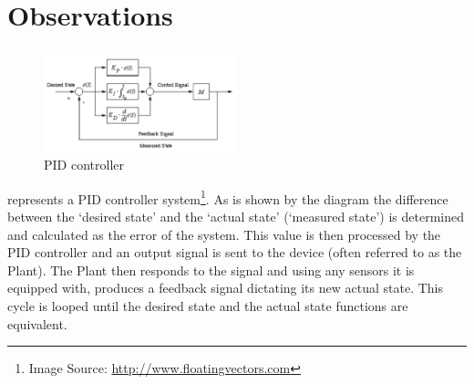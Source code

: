 \section{Observations}\label{section_two}
\begin{figure}[tbd]
\centering
\includegraphics[width=0.5\textwidth]{images/pid.pdf}
\caption{\label{pid-controller} PID controller}
\end{figure}

 represents a PID controller system\footnote{Image Source: \url{http://www.floatingvectors.com}}. As is shown by the diagram the difference between the ‘desired state’ and the ‘actual state’ (‘measured state’) is determined and calculated as the error of the system. This value is then processed by the PID controller and an output signal is sent to the device (often referred to as the Plant). The Plant then responds to the signal and using any sensors it is equipped with, produces a feedback signal dictating its new actual state. This cycle is looped until the desired state and the actual state functions are equivalent.
